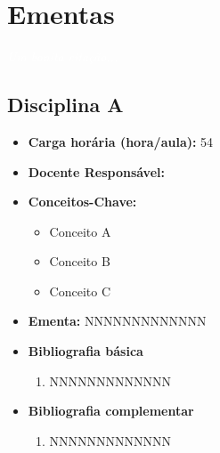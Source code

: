 \documentclass[11pt,fleqn]{book} %
\begin{document}
\chapter{Ementas}\label{ementas}
\vspace{6em}
\begin{flushright}
	\textit{\textcolor{white}{Um bonita citação...}}
\end{flushright}
\vspace{12em}


\newpage
\section{Disciplina A}\label{disc:interacoes}

\begin{itemize}
	\item \textbf{Carga horária (hora/aula):} 54
	\item \textbf{Docente Responsável:} 
	\item \textbf{Conceitos-Chave:}
	\begin{itemize}
		\item Conceito A
		\item Conceito B
		\item Conceito C
	\end{itemize}
	\item \textbf{Ementa:} NNNNNNNNNNNNN
	\item \textbf{Bibliografia básica}
	\begin{enumerate}
		\item NNNNNNNNNNNNN
	\end{enumerate}
	\item \textbf{Bibliografia complementar}
	\begin{enumerate}
		\item NNNNNNNNNNNNN
	\end{enumerate}	
\end{itemize}



\end{document}
